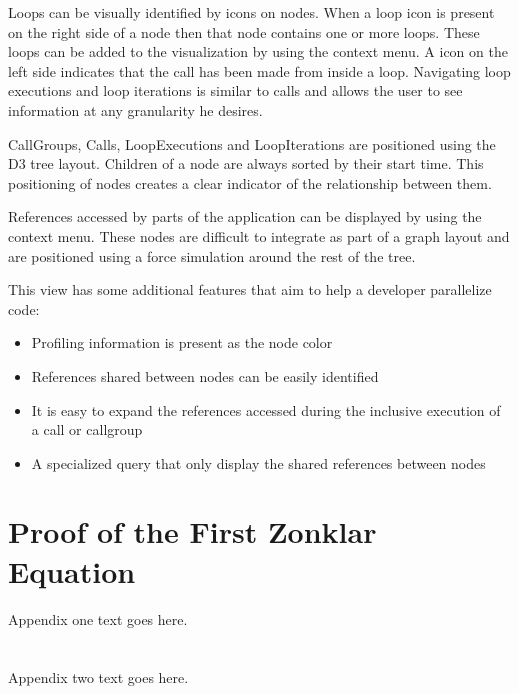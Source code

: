 \documentclass[conference]{IEEEtran}
\begin{document}
Loops can be visually identified by icons on nodes. When a loop icon is present on the right side of a node then that node contains one or more loops. These loops can be added to the visualization by using the context menu. A icon on the left side indicates that the call has been made from inside a loop. Navigating loop executions and loop iterations is similar to calls and allows the user to see information at any granularity he desires.

CallGroups, Calls, LoopExecutions and LoopIterations are positioned using the D3 tree layout. Children of a node are always sorted by their start time. This positioning of nodes creates a clear indicator of the relationship between them.

References accessed by parts of the application can be displayed by using the context menu. These nodes are difficult to integrate as part of a graph layout and are positioned using a force simulation around the rest of the tree.

This view has some additional features that aim to help a developer parallelize code:

\begin{itemize}
	\item Profiling information is present as the node color
	\item References shared between nodes can be easily identified
	\item It is easy to expand the references accessed during the inclusive execution of a call or callgroup
	\item A specialized query that only display the shared references between nodes
\end{itemize}

\appendices
\section{Proof of the First Zonklar Equation}
Appendix one text goes here.

\section{}
Appendix two text goes here.

\ifCLASSOPTIONcaptionsoff
  \newpage
\fi
\end{document}
